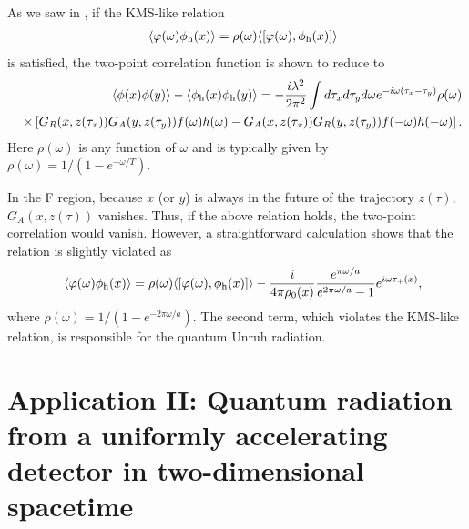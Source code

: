 \documentclass[aps,prd,preprintnumbers,nofootinbib,showpacs,11pt]{revtex4}%
\begin{document}
\begin{widetext}
As we saw in \cite{IYZ}, if the KMS-like relation
\begin{eqnarray}
&& \langle \varphi(\omega) \phi_{\rm h} (x) \rangle = \rho(\omega) \langle [\varphi(\omega), \phi_{\rm h}(x)] \rangle
\end{eqnarray}
is satisfied, the two-point correlation function is shown to
reduce to 
\begin{eqnarray}
&& \langle \phi(x) \phi(y) \rangle  - \langle \phi_{\rm h}(x) \phi_{\rm h}(y) \rangle = 
-\frac{ i \lambda^2 }{2 \pi^2} \int d \tau_x d \tau_y d \omega e^{-i \omega (\tau_x -\tau_y)} \rho(\omega)
\nonumber \\
&& \times \left[ G_R(x, z(\tau_x)) G_A(y,z(\tau_y)) f(\omega) h(\omega) 
-G_A(x, z(\tau_x)) G_R(y,z(\tau_y)) f(-\omega) h(-\omega) \right].
\end{eqnarray}
Here  $\rho(\omega)$ is any function of $\omega$ and is typically given by $\rho(\omega)=1/(1-e^{- \omega/T})$.

In the F region, because $x$ (or $y$) is always in the future of the trajectory $z(\tau)$, 
$G_A(x, z(\tau))$ vanishes. Thus, if the above relation holds, the two-point correlation would vanish. 
However, a straightforward calculation shows \cite{IYZ} that the relation is slightly violated as
\begin{eqnarray}
&& \langle \varphi(\omega) \phi_{\rm h} (x) \rangle = \rho(\omega) \langle [\varphi(\omega), \phi_{\rm h}(x)] \rangle
- \frac{i}{4\pi \rho_0(x)} \frac{e^{\pi \omega/a}}{e^{2\pi \omega/a}-1} e^{i \omega \tau_+(x)},
\end{eqnarray}
where $\rho(\omega)=1/(1-e^{-2\pi \omega/a})$. The second term, which violates the KMS-like relation, is responsible
for the quantum Unruh radiation.

\section{Application II: Quantum radiation from a uniformly accelerating detector in two-dimensional spacetime
\label{Sec:radiation-in-d2} }


\end{widetext}
\end{document}
